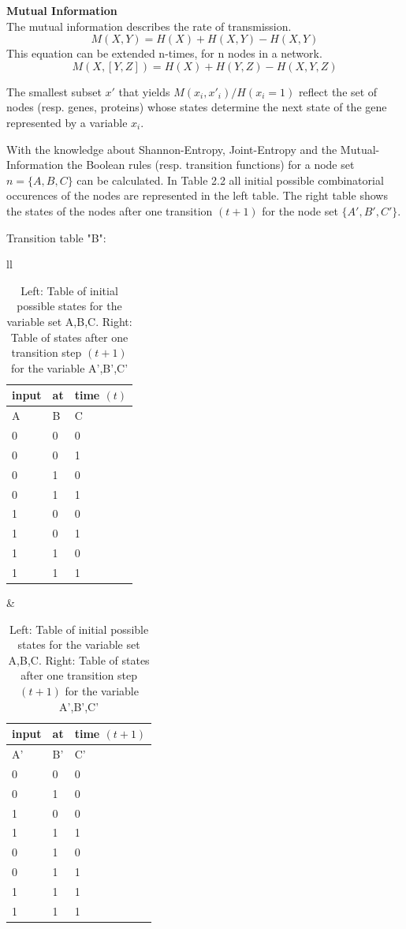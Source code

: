 \begin{defn}\textbf{Mutual Information}\\
The mutual information describes the rate of transmission.
\begin{equation}
M(X,Y)=H(X)+H(X,Y)-H(X,Y)
\end{equation}
This equation can be extended n-times, for n nodes in a network.
\begin{equation}
M(X,[Y,Z])=H(X)+H(Y,Z)-H(X,Y,Z)
\end{equation}
\end{defn}

The smallest subset $x'$ that yields $M(x_{i},x'_{i})/H(x_{i}=1)$ reflect the set of nodes (resp. genes, proteins) whose states determine the next state of the gene represented by a variable $x_i$. 

\begin{exmp}
With the knowledge about Shannon-Entropy, Joint-Entropy and the Mutual-Information the Boolean rules (resp. transition functions) for a node set $n=\{A,B,C\}$ can be calculated. In Table 2.2 all initial possible combinatorial occurences of the nodes are represented in the left table. The right table shows the states of the nodes after one transition $(t+1)$ for the node set $\{A',B',C'\}$.
\end{exmp}
Transition table "B":\\
\begin{table}[hbt!]
\captionsetup{width=0.6\linewidth}
\begin{center}
\begin{tabular}{ll}
\begin{tabular}{l|l|l}
input & at & time $(t)$\\
\hline
A & B & C\\
\hline
0 & 0 & 0\\
0 & 0 & 1\\
0 & 1 & 0\\
0 & 1 & 1\\
1 & 0 & 0\\
1 & 0 & 1\\
1 & 1 & 0\\
1 & 1 & 1\\
\end{tabular}
&
\begin{tabular}{l|l|l}
input & at & time $(t+1)$\\
\hline
A' & B' & C'\\
\hline
0 & 0 & 0\\
0 & 1 & 0\\
1 & 0 & 0\\
1 & 1 & 1\\
0 & 1 & 0\\
0 & 1 & 1\\
1 & 1 & 1\\
1 & 1 & 1\\
\end{tabular}
\end{tabular}
\end{center}
\caption{Left: Table of initial possible states for the variable set A,B,C. Right: Table of states after one transition step $(t+1)$ for the variable A',B',C'}
\end{table}

